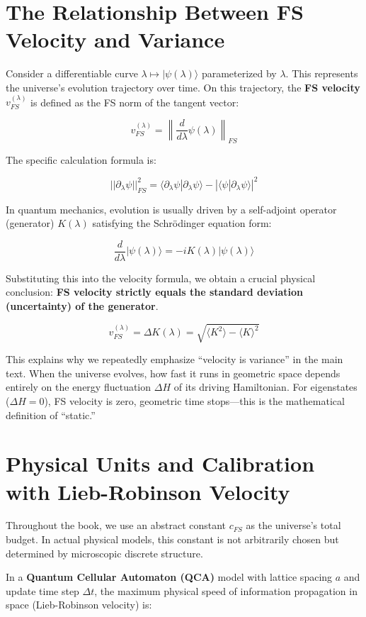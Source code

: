 \section{The Relationship Between FS Velocity and Variance}

Consider a differentiable curve $\lambda \mapsto |\psi(\lambda)\rangle$ parameterized by $\lambda$. This represents the universe's evolution trajectory over time. On this trajectory, the \textbf{FS velocity} $v_{FS}^{(\lambda)}$ is defined as the FS norm of the tangent vector:

\[v_{FS}^{(\lambda)} = \left\| \frac{d}{d\lambda}\psi(\lambda) \right\|_{FS}\]

The specific calculation formula is:

\[||\partial_{\lambda}\psi||_{FS}^2 = \langle\partial_{\lambda}\psi|\partial_{\lambda}\psi\rangle - |\langle\psi|\partial_{\lambda}\psi\rangle|^2\]

In quantum mechanics, evolution is usually driven by a self-adjoint operator (generator) $K(\lambda)$ satisfying the Schrödinger equation form:

\[\frac{d}{d\lambda}|\psi(\lambda)\rangle = -iK(\lambda)|\psi(\lambda)\rangle\]

Substituting this into the velocity formula, we obtain a crucial physical conclusion: \textbf{FS velocity strictly equals the standard deviation (uncertainty) of the generator}.

\[v_{FS}^{(\lambda)} = \Delta K(\lambda) = \sqrt{\langle K^2 \rangle - \langle K \rangle^2}\]

This explains why we repeatedly emphasize ``velocity is variance'' in the main text. When the universe evolves, how fast it runs in geometric space depends entirely on the energy fluctuation $\Delta H$ of its driving Hamiltonian. For eigenstates ($\Delta H = 0$), FS velocity is zero, geometric time stops---this is the mathematical definition of ``static.''

\section{Physical Units and Calibration with Lieb-Robinson Velocity}

Throughout the book, we use an abstract constant $c_{FS}$ as the universe's total budget. In actual physical models, this constant is not arbitrarily chosen but determined by microscopic discrete structure.

In a \textbf{Quantum Cellular Automaton (QCA)} model with lattice spacing $a$ and update time step $\Delta t$, the maximum physical speed of information propagation in space (Lieb-Robinson velocity) is:

